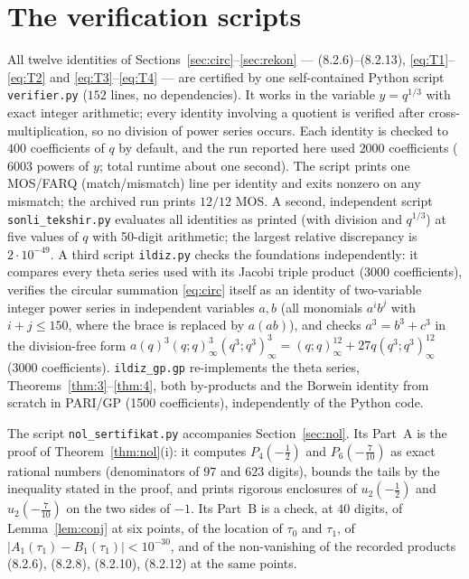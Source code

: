 \documentclass[pdflatex,sn-mathphys-num]{sn-jnl}
\theoremstyle{thmstyleone}%
\theoremstyle{thmstyletwo}%
\begin{document}
\section{The verification scripts}\label{sec:verifier}
All twelve identities of Sections~\ref{sec:circ}--\ref{sec:rekon} --- (8.2.6)--(8.2.13),
\eqref{eq:T1}--\eqref{eq:T2} and \eqref{eq:T3}--\eqref{eq:T4} --- are certified by one self-contained Python
script \texttt{verifier.py} ($152$ lines, no dependencies). It works in
the variable $y=q^{1/3}$ with exact integer arithmetic; every identity
involving a quotient is verified after cross-multiplication, so no division of
power series occurs. Each identity is checked to $400$ coefficients of $q$ by
default, and the run reported here used $2000$ coefficients ($6003$ powers of
$y$; total runtime about one second). The script prints one MOS/FARQ
(match/mismatch) line per identity and exits nonzero on any mismatch; the
archived run prints $12/12$ MOS. A second, independent script \texttt{sonli\_tekshir.py} evaluates all identities as printed (with division and $q^{1/3}$) at five values of $q$ with 50-digit arithmetic; the largest relative discrepancy is $2\cdot10^{-49}$. A third script \texttt{ildiz.py} checks the foundations independently: it compares every theta series used with its Jacobi triple product (3000 coefficients), verifies the circular summation \eqref{eq:circ} itself as an identity of two-variable integer power series in independent variables $a,b$ (all monomials $a^ib^j$ with $i+j\le150$, where the brace is replaced by $a(ab)$), and checks $a^3=b^3+c^3$ in the division-free form $a(q)^3(q;q)_\infty^3(q^3;q^3)_\infty^3=(q;q)_\infty^{12}+27q(q^3;q^3)_\infty^{12}$ (3000 coefficients). \texttt{ildiz\_gp.gp} re-implements the theta series, Theorems~\ref{thm:3}--\ref{thm:4}, both by-products and the Borwein identity from scratch in PARI/GP (1500 coefficients), independently of the Python code.

The script \texttt{nol\_sertifikat.py} accompanies Section~\ref{sec:nol}. Its Part~A is the proof of Theorem~\ref{thm:nol}(i): it computes $P_4(-\frac12)$ and $P_6(-\frac7{10})$ as exact rational numbers (denominators of $97$ and $623$ digits), bounds the tails by the inequality stated in the proof, and prints rigorous enclosures of $u_2(-\frac12)$ and $u_2(-\frac7{10})$ on the two sides of $-1$. Its Part~B is a check, at $40$ digits, of Lemma~\ref{lem:conj} at six points, of the location of $\tau_0$ and $\tau_1$, of $|A_1(\tau_1)-B_1(\tau_1)|<10^{-30}$, and of the non-vanishing of the recorded products (8.2.6), (8.2.8), (8.2.10), (8.2.12) at the same points.
\end{document}
